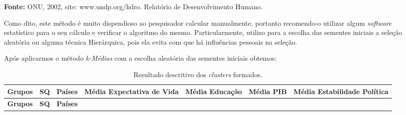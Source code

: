 \documentclass[
]{book}
\begin{document}
\textbf{Fonte:} ONU, 2002, site: www.undp.org/hdro. Relatório de Desenvolvimento Humano.

Como dito, este método é muito dispendioso ao pesquisador calcular manualmente, portanto recomendo-o utilizar algum \emph{software} estatístico para o seu cálculo e verificar o algoritmo do mesmo. Particularmente, utilizo para a escolha das sementes iniciais a seleção aleatória ou alguma técnica Hierárquica, pois ela evita com que há influências pessoais na seleção.

Após aplicarmos o método \emph{k-Médias} com a escolha aleatória das sementes iniciais obtemos:

\begin{longtable}[]{@{}lllclll@{}}
\caption{\label{tab:exkmeans} Resultado descritivo dos \emph{clusters} formados.}\tabularnewline
\toprule
\begin{minipage}[b]{0.09\columnwidth}\raggedright
\textbf{Grupos}\strut
\end{minipage} & \begin{minipage}[b]{0.09\columnwidth}\raggedright
\textbf{SQ}\strut
\end{minipage} & \begin{minipage}[b]{0.09\columnwidth}\raggedright
\textbf{Países}\strut
\end{minipage} & \begin{minipage}[b]{0.27\columnwidth}\centering
\textbf{Média Expectativa de Vida}\strut
\end{minipage} & \begin{minipage}[b]{0.09\columnwidth}\raggedright
\textbf{Média Educação}\strut
\end{minipage} & \begin{minipage}[b]{0.09\columnwidth}\raggedright
\textbf{Média PIB}\strut
\end{minipage} & \begin{minipage}[b]{0.09\columnwidth}\raggedright
\textbf{Média Estabilidade Política}\strut
\end{minipage}\tabularnewline
\midrule
\endfirsthead
\toprule
\begin{minipage}[b]{0.09\columnwidth}\raggedright
\textbf{Grupos}\strut
\end{minipage} & \begin{minipage}[b]{0.09\columnwidth}\raggedright
\textbf{SQ}\strut
\end{minipage} & \begin{minipage}[b]{0.09\columnwidth}\raggedright
\textbf{Países}\strut
\end{minipage} & \begin{minipage}[b]{0.27\columnwidth}\centering

\end{minipage}
\end{longtable}
\end{document}
